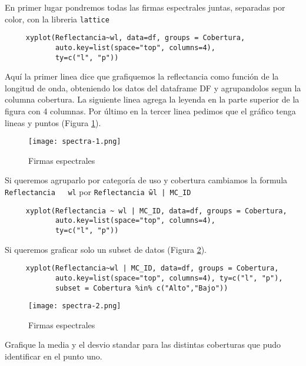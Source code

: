 \begin{exa}
     En primer lugar pondremos todas las firmas espectrales juntas, separadas
     por color, con la libreria \texttt{lattice}
     \begin{lstlisting}
     xyplot(Reflectancia~wl, data=df, groups = Cobertura,
            auto.key=list(space="top", columns=4),
            ty=c("l", "p"))
     \end{lstlisting}
     Aqu\'i la primer linea dice que grafiquemos la reflectancia como funci\'on de
     la longitud de onda, obteniendo los datos del dataframe DF y agrupandolos
     segun la columna cobertura. La siguiente linea agrega la leyenda en la
     parte superior de la figura con 4 columnas. Por \'ultimo en la tercer linea
     pedimos que el gr\'afico tenga lineas y puntos (Figura \ref{fig:spectra-1}).

     \begin{figure}[h!]
     \begin{center}
         \texttt{[image: spectra-1.png]}
     \end{center}
     \caption{Firmas espectrales}
     \label{fig:spectra-1}
     \end{figure}

     Si queremos agruparlo por categor\'ia de uso y cobertura cambiamos la formula
     \texttt{Reflectancia ~ wl} por \texttt{Reflectancia \~ wl | MC\_ID}
     \begin{lstlisting}
     xyplot(Reflectancia ~ wl | MC_ID, data=df, groups = Cobertura,
            auto.key=list(space="top", columns=4),
            ty=c("l", "p"))
     \end{lstlisting}

     Si queremos graficar solo un subset de datos (Figura \ref{fig:spectra-2}).

     \begin{lstlisting}
     xyplot(Reflectancia~wl | MC_ID, data=df, groups = Cobertura,
            auto.key=list(space="top", columns=4), ty=c("l", "p"),
            subset = Cobertura %in% c("Alto","Bajo"))
     \end{lstlisting}
     \begin{figure}[h!]
     \begin{center}
         \texttt{[image: spectra-2.png]}
     \end{center}
     \caption{Firmas espectrales}
     \label{fig:spectra-2}
     \end{figure}
 \end{exa}

\begin{act}
    Grafique la media y el desvio standar para las distintas coberturas que pudo
     identificar en el punto uno.
\end{act}
